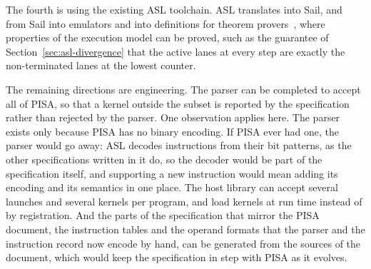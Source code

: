 The fourth is using the existing ASL toolchain. ASL translates into Sail, and
from Sail into emulators and into definitions for theorem
provers~\cite{isa-semantics}, where properties of the execution model
can be proved, such as the guarantee of Section~\ref{sec:asl-divergence}
that the active lanes at every step are exactly the non-terminated
lanes at the lowest counter.

The remaining directions are engineering. The parser can be completed
to accept all of PISA, so that a kernel outside the subset is reported
by the specification rather than rejected by the parser. One
observation applies here. The parser exists only because PISA has no
binary encoding. If PISA ever had one, the parser would go away: ASL
decodes instructions from their bit patterns, as the other
specifications written in it do, so the decoder would be part of the
specification itself, and supporting a new instruction would mean
adding its encoding and its semantics in one place. The host library
can accept several launches and several kernels per program, and load
kernels at run time instead of by registration. And the parts of the
specification that mirror the PISA document, the instruction tables
and the operand formats that the parser and the instruction record now
encode by hand, can be generated from the sources of the document,
which would keep the specification in step with PISA as it evolves.